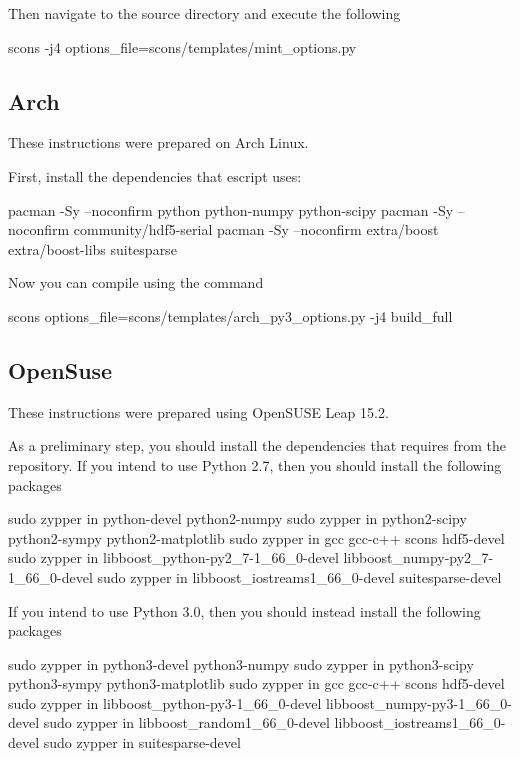 \documentclass{esysdoc}
\begin{document}
\noindent Then navigate to the source directory and execute the following
\begin{shellCode}
scons -j4 options_file=scons/templates/mint_options.py
\end{shellCode}

\subsection{Arch}\label{sec:archsrc}
These instructions were prepared on Arch Linux. \newline

First, install the dependencies that escript uses:
\begin{shellCode}
pacman -Sy --noconfirm python python-numpy python-scipy
pacman -Sy --noconfirm community/hdf5-serial
pacman -Sy --noconfirm extra/boost extra/boost-libs suitesparse
\end{shellCode}

Now you can compile \escript using the command
\begin{shellCode}
scons options_file=scons/templates/arch_py3_options.py -j4 build_full
\end{shellCode}

\subsection{OpenSuse}\label{sec:susesrc}
These instructions were prepared using OpenSUSE Leap 15.2. \newline

\noindent As a preliminary step, you should install the dependencies that \esfinley requires from the repository.
\noindent  If you intend to use Python 2.7, then you should install the following packages
\begin{shellCode}
sudo zypper in python-devel python2-numpy
sudo zypper in python2-scipy python2-sympy python2-matplotlib
sudo zypper in gcc gcc-c++ scons hdf5-devel
sudo zypper in libboost_python-py2_7-1_66_0-devel libboost_numpy-py2_7-1_66_0-devel
sudo zypper in libboost_iostreams1_66_0-devel suitesparse-devel
\end{shellCode}

\noindent If you intend to use Python 3.0, then you should instead install the following packages
\begin{shellCode}
sudo zypper in python3-devel python3-numpy
sudo zypper in python3-scipy python3-sympy python3-matplotlib
sudo zypper in gcc gcc-c++ scons hdf5-devel
sudo zypper in libboost_python-py3-1_66_0-devel libboost_numpy-py3-1_66_0-devel
sudo zypper in libboost_random1_66_0-devel libboost_iostreams1_66_0-devel
sudo zypper in suitesparse-devel
\end{shellCode}
\end{document}
